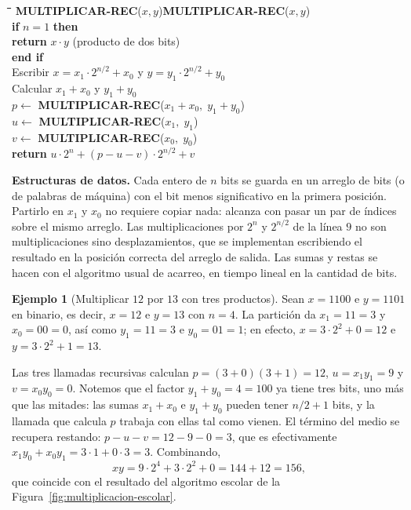 \documentclass[12pt, spanish, oneside, openany]{book}
\newcommand{\pl}[1]{\makebox[1.6em][r]{\texttt{\footnotesize #1}}\hspace{0.9em}}
\newenvironment{pseudo}[1]{%
  \begin{center}%
  \begin{mdframed}[style=pseudobox]%
  \small
  \begin{tabbing}%
  \hspace{2.5em}\=\hspace{1.5em}\=\hspace{1.5em}\=\hspace{1.5em}\=\hspace{1.5em}\=\kill
  \def\pseudotitulo{#1}\ifx\pseudotitulo\empty\else#1\\[3pt]\fi}%
  {\end{tabbing}\end{mdframed}\end{center}}
\newenvironment{estructuras}%
  {\begin{center}\begin{minipage}{0.93\textwidth}\begin{mdframed}[style=estrbox]%
   \small\textbf{Estructuras de datos.}\;}%
  {\end{mdframed}\end{minipage}\end{center}}
\theoremstyle{uprightplain}
\theoremstyle{definition}
\newtheorem{ejemplo}[teorema]{Ejemplo}
\theoremstyle{remark}
\theoremstyle{definition}
\begin{document}
\begin{pseudo}{\textbf{MULTIPLICAR-REC}($x,y$)}
\pl{1}\> \textbf{if} $n = 1$ \textbf{then}\\
\pl{2}\>\> \textbf{return} $x\cdot y$ \quad (producto de dos bits)\\
\pl{3}\> \textbf{end if}\\
\pl{4}\> Escribir $x = x_1\cdot 2^{n/2}+x_0$ \; y \; $y = y_1\cdot 2^{n/2}+y_0$\\
\pl{5}\> Calcular $x_1+x_0$ \; y \; $y_1+y_0$\\
\pl{6}\> $p \leftarrow$ \textbf{MULTIPLICAR-REC}($x_1+x_0,\; y_1+y_0$)\\
\pl{7}\> $u \leftarrow$ \textbf{MULTIPLICAR-REC}($x_1,\; y_1$)\\
\pl{8}\> $v \leftarrow$ \textbf{MULTIPLICAR-REC}($x_0,\; y_0$)\\
\pl{9}\> \textbf{return} $u\cdot 2^{n} + (p - u - v)\cdot 2^{n/2} + v$
\end{pseudo}

\begin{estructuras}
Cada entero de $n$ bits se guarda en un arreglo de bits (o de palabras de
máquina) con el bit menos significativo en la primera posición. Partirlo en
$x_1$ y $x_0$ no requiere copiar nada: alcanza con pasar un par de índices sobre
el mismo arreglo. Las multiplicaciones por $2^n$ y $2^{n/2}$ de la línea $9$ no
son multiplicaciones sino desplazamientos, que se implementan escribiendo el
resultado en la posición correcta del arreglo de salida. Las sumas y restas se
hacen con el algoritmo usual de acarreo, en tiempo lineal en la cantidad de
bits.
\end{estructuras}

\begin{ejemplo}[Multiplicar $12$ por $13$ con tres productos]
\label{ej:karatsuba-12-13}
Sean $x=1100$ e $y=1101$ en binario, es decir, $x=12$ e $y=13$ con $n=4$. La partición da $x_1=11=3$ y $x_0=00=0$, así como $y_1=11=3$ e $y_0=01=1$; en efecto, $x=3\cdot 2^2+0=12$ e $y=3\cdot 2^2+1=13$.

Las tres llamadas recursivas calculan $p=(3+0)(3+1)=12$, $u=x_1y_1=9$ y $v=x_0y_0=0$. Notemos que el factor $y_1+y_0=4=100$ ya tiene tres bits, uno más que las mitades: las sumas $x_1+x_0$ e $y_1+y_0$ pueden tener $n/2+1$ bits, y la llamada que calcula $p$ trabaja con ellas tal como vienen. El término del medio se recupera restando: $p-u-v=12-9-0=3$, que es efectivamente $x_1y_0+x_0y_1=3\cdot 1+0\cdot 3=3$. Combinando,
\[
xy = 9\cdot 2^4 + 3\cdot 2^2 + 0 = 144+12 = 156,
\]
que coincide con el resultado del algoritmo escolar de la Figura~\ref{fig:multiplicacion-escolar}.
\end{ejemplo}
\end{document}
